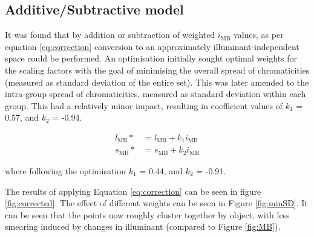 


\subsection{Additive/Subtractive model}

It was found that by addition or subtraction of weighted $i_{\text{MB}}$ values, as per equation \ref{eq:correction} conversion to an approximately illuminant-independent space could be performed. An optimisation initially sought optimal weights for the scaling factors with the goal of minimising the overall spread of chromaticities (measured as standard deviation of the entire set). This was later amended to the intra-group spread of chromaticities, measured as standard deviation within each group. This had a relatively minor impact, resulting in coefficient values of $k_{1}$ = 0.57, and $k_{2}$ = -0.94. 

\begin{subequations} \label{eq:correction}
\begin{align}
l_{\text{MB}}* &= l_{\text{MB}} + k_{1}i_{\text{MB}}\\ %
s_{\text{MB}}* &= s_{\text{MB}} + k_{2}i_{\text{MB}}
\end{align}
\end{subequations}

where following the optimisation $k_{1}$ = 0.44, and $k_{2}$ = -0.91.

The results of applying Equation \ref{eq:correction} can be seen in figure \ref{fig:corrected}. The effect of different weights can be seen in Figure \ref{fig:minSD}. It can be seen that the points now roughly cluster together by object, with less smearing induced by changes in illuminant (compared to Figure \ref{fig:MB}).

